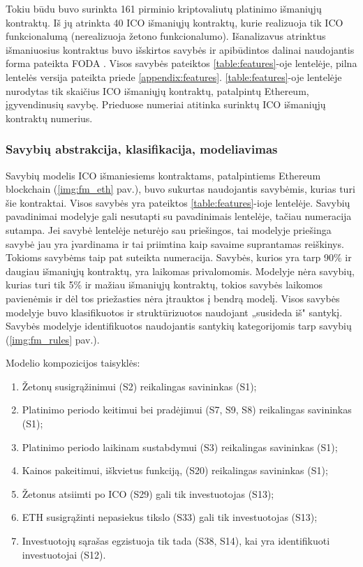 \documentclass{VUMIFPSbakalaurinis}
\begin{document}
Tokiu būdu buvo surinkta 161 pirminio kriptovaliutų platinimo išmaniųjų kontraktų. Iš jų atrinkta 40 ICO išmaniųjų kontraktų, kurie realizuoja tik ICO funkcionalumą (nerealizuoja žetono funkcionalumo). Išanalizavus atrinktus išmaniuosius kontraktus buvo išskirtos savybės ir apibūdintos dalinai naudojantis forma pateikta FODA \cite{Kang1990}. Visos savybės pateiktos \ref{table:features}-oje lentelėje, pilna lentelės versija pateikta priede \ref{appendix:features}. \ref{table:features}-oje lentelėje nurodytas tik skaičius ICO išmaniųjų kontraktų, patalpintų Ethereum, įgyvendinusių savybę. Prieduose numeriai atitinka surinktų ICO išmaniųjų kontraktų numerius.




\subsubsection{Savybių abstrakcija, klasifikacija, modeliavimas} \label{modelis}

Savybių modelis ICO išmaniesiems kontraktams, patalpintiems Ethereum blockchain (\ref{img:fm_eth} pav.), buvo sukurtas naudojantis savybėmis, kurias turi šie kontraktai. Visos savybės yra pateiktos \ref{table:features}-ioje lentelėje. Savybių pavadinimai modelyje gali nesutapti su pavadinimais lentelėje, tačiau numeracija sutampa. Jei savybė lentelėje neturėjo sau priešingos, tai modelyje priešinga savybė jau yra įvardinama ir tai priimtina kaip savaime suprantamas reiškinys. Tokioms savybėms taip pat suteikta numeracija. Savybės, kurios yra tarp 90\% ir daugiau išmaniųjų kontraktų, yra laikomas privalomomis. Modelyje nėra savybių, kurias turi tik 5\% ir mažiau išmaniųjų kontraktų, tokios savybės laikomos pavienėmis ir dėl tos priežasties nėra įtrauktos į bendrą modelį. Visos savybės modelyje buvo klasifikuotos ir struktūrizuotos naudojant „susideda iš" santykį. Savybės modelyje identifikuotos naudojantis santykių kategorijomis tarp savybių (\ref{img:fm_rules} pav.).

Modelio kompozicijos taisyklės:
\begin{enumerate}[topsep=0pt,itemsep=-1ex,partopsep=1ex,parsep=1ex]
\item Žetonų susigrąžinimui (S2) reikalingas savininkas (S1);
\item Platinimo periodo keitimui bei pradėjimui (S7, S9, S8) reikalingas savininkas (S1);
\item Platinimo periodo laikinam sustabdymui (S3) reikalingas savininkas (S1);
\item Kainos pakeitimui, iškvietus funkciją, (S20) reikalingas savininkas (S1);
\item Žetonus atsiimti po ICO (S29) gali tik investuotojas (S13);
\item ETH susigrąžinti nepasiekus tikslo (S33) gali tik investuotojas (S13);
\item Investuotojų sąrašas egzistuoja tik tada (S38, S14), kai yra identifikuoti investuotojai (S12).
\end{enumerate}
\end{document}
